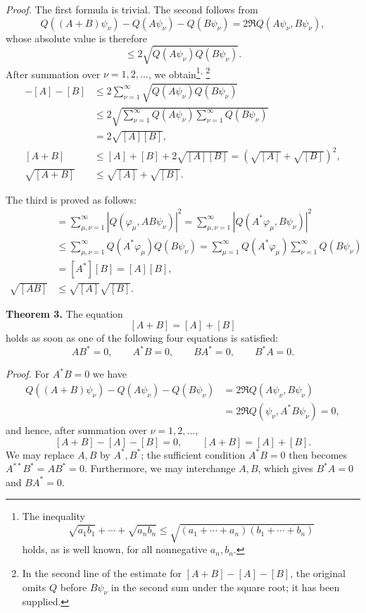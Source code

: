 \documentclass[fontsize=13pt,paper=b5,twoside,bookmarkpackage=false]{scrartcl}
\newcounter{translatornote}
\newcommand{\tnote}[1]{%
  \begingroup\stepcounter{translatornote}%
  \renewcommand{\thefootnote}{T\arabic{translatornote}}%
  \footnote[0]{#1}\endgroup}
\newcommand{\tnoteafter}[1]{\textsuperscript{,}\tnote{#1}}
\begin{document}
\textit{Proof.} The first formula is trivial. The second follows from
\[
 Q((A+B)\psi_\nu)-Q(A\psi_\nu)-Q(B\psi_\nu)
 =2\Re Q(A\psi_\nu,B\psi_\nu),
\]
whose absolute value is therefore
\[
 \leq2\sqrt{Q(A\psi_\nu)Q(B\psi_\nu)}.
\]
After summation over $\nu=1,2,\ldots$, we obtain\footnote[31]{\label{fn:31}The inequality
\[
 \sqrt{a_1b_1}+\cdots+\sqrt{a_nb_n}
 \leq\sqrt{(a_1+\cdots+a_n)(b_1+\cdots+b_n)}
\]
holds, as is well known, for all nonnegative $a_n,b_n$.}\tnoteafter{In the second line of the estimate for $[A+B]-[A]-[B]$, the original omits $Q$ before $B\psi_\nu$ in the second sum under the square root; it has been supplied.}
\begin{align*}
 [A+B]-[A]-[B]
 &\leq2\sum_{\nu=1}^{\infty}\sqrt{Q(A\psi_\nu)Q(B\psi_\nu)}\\
 &\leq2\sqrt{\sum_{\nu=1}^{\infty}Q(A\psi_\nu)
                  \sum_{\nu=1}^{\infty}Q(B\psi_\nu)}\\
 &=2\sqrt{[A][B]},\\
 [A+B]&\leq[A]+[B]+2\sqrt{[A][B]}
 =(\sqrt{[A]}+\sqrt{[B]})^2,\\
 \sqrt{[A+B]}&\leq\sqrt{[A]}+\sqrt{[B]}.
\end{align*}


The third is proved as follows:
\begin{align*}
 [AB]&=\sum_{\mu,\nu=1}^{\infty}|Q(\varphi_\mu,AB\psi_\nu)|^2
 =\sum_{\mu,\nu=1}^{\infty}|Q(A^*\varphi_\mu,B\psi_\nu)|^2\\
 &\leq\sum_{\mu,\nu=1}^{\infty}Q(A^*\varphi_\mu)Q(B\psi_\nu)
 =\sum_{\mu=1}^{\infty}Q(A^*\varphi_\mu)
  \sum_{\nu=1}^{\infty}Q(B\psi_\nu)\\
 &=[A^*][B]=[A][B],\\
 \sqrt{[AB]}&\leq\sqrt{[A]}\sqrt{[B]}.
\end{align*}

\par\medskip\noindent{}\label{thm:XI:3}\textbf{Theorem 3.}
The equation
\[
 [A+B]=[A]+[B]
\]
holds as soon as one of the following four equations is satisfied:
\[
 AB^*=0,\qquad A^*B=0,\qquad BA^*=0,\qquad B^*A=0.
\]

\textit{Proof.} For $A^*B=0$ we have
\begin{align*}
 Q((A+B)\psi_\nu)-Q(A\psi_\nu)-Q(B\psi_\nu)
 &=2\Re Q(A\psi_\nu,B\psi_\nu)\\
 &=2\Re Q(\psi_\nu,A^*B\psi_\nu)=0,
\end{align*}
and hence, after summation over $\nu=1,2,\ldots$,
\[
 [A+B]-[A]-[B]=0,\qquad[A+B]=[A]+[B].
\]
We may replace $A,B$ by $A^*,B^*$; the sufficient condition $A^*B=0$ then becomes $A^{**}B^*=AB^*=0$. Furthermore, we may interchange $A,B$, which gives $B^*A=0$ and $BA^*=0$.
\end{document}

